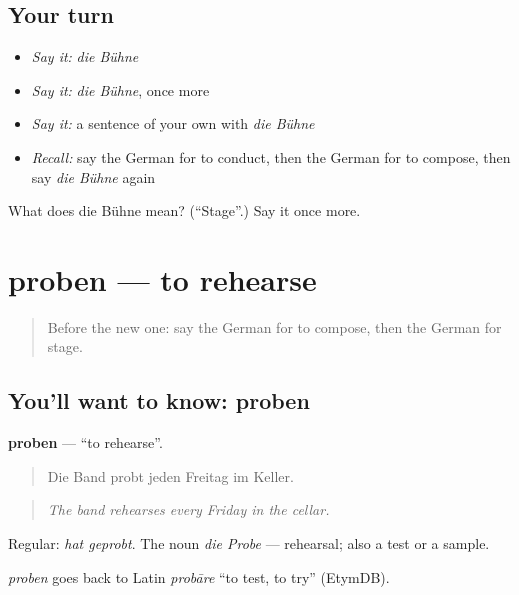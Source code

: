 \subsection*{Your turn}
\begin{itemize}
\raggedright
  \item \emph{Say it:} \emph{die Bühne}
  \item \emph{Say it:} \emph{die Bühne}, once more
  \item \emph{Say it:} a sentence of your own with \emph{die Bühne}
  \item \emph{Recall:} say the German for to conduct, then the German for to compose, then say \emph{die Bühne} again
\end{itemize}

\begin{tcolorbox}[breakable,colback=teal!4,colframe=teal!35!black,title={Before you move on}]
What does die Bühne mean? (\textquotedblleft{}Stage\textquotedblright{}.) Say it once more.
\end{tcolorbox}
\section[proben]{proben — to rehearse}

\label{lesson:GE-C516-proben}



\begin{quote}
Before the new one: say the German for to compose, then the German for stage.
\end{quote}

\subsection*{You'll want to know: proben}
\textbf{proben} — \textquotedblleft{}to rehearse\textquotedblright{}.

\begin{quote}
Die Band probt jeden Freitag im Keller.
\end{quote}

\begin{quote}
\emph{The band rehearses every Friday in the cellar.}
\end{quote}

Regular: \emph{hat geprobt}. The noun \emph{die Probe} — rehearsal; also a test or a sample.

\begin{cousinweb}
\emph{proben} goes back to Latin \emph{probāre} \textquotedblleft{}to test, to try\textquotedblright{} (EtymDB).
\end{cousinweb}

